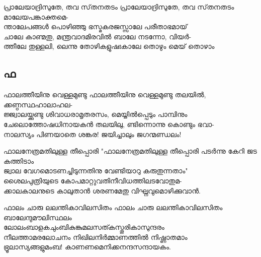 \begin{enumerate}


\begin{slokam}{\VSv}{\MPN}{പ്രാലേയാദ്രിസുതേ, തവ സ്‌തനതടം}
പ്രാലേയാദ്രിസുതേ, തവ സ്‌തനതടം മാലേയപങ്കാക്തമെ-\\
ന്താലേപങ്ങൾ പൊഴിഞ്ഞു ഭസ്മകരജസ്സാലേ പരീതാഭമായ്\\
ചാലേ കാണ്മതു, മന്ത്രവാദമിരവിൽ ബാലേ നടന്നോ, വിയർ-\\
ത്തീലേ തുള്ളലി, ലെന്നു തോഴികളുഷഃകാലേ തൊഴും മെയ് തൊഴാം
\end{slokam}



\end{enumerate}
\subsection{ഫ}
\begin{enumerate}

\begin{slokam}{\VSv}{\Unk}{ഫാലത്തീയിനു വെള്ളമുണ്ടു}
ഫാലത്തീയിനു വെള്ളമുണ്ടു തലയിൽ, ക്കണ്ഠസ്ഥഹാലാഹല-\\
ജ്ജ്വാലയ്ക്കുണ്ടു ശിവാധരാമൃതരസം, മെയ്യിൽപ്പെടും പാമ്പിനും\\
ചേലൊത്തോഷധിനായകൻ തലയിലു, ണ്ടിന്നൊന്നു കൊണ്ടും ഭവാ-\\
നാലസ്യം പിണയാതെ ശങ്കര! ജയിച്ചാലും ജഗന്മണ്ഡലം!
\end{slokam}



\begin{slokam}{\VKm}{\Balendu}{ഫാലനേത്രമതിലുള്ള തീപ്പൊരി}
"ഫാലനേത്രമതിലുള്ള തീപ്പൊരി പടര്‍ന്നു കേറി ജട കത്തിടാം\\
ജ്വാല വേഗമൊടണച്ചിടുന്നതിനു വേണ്ടിയാറു കരുതുന്നതാം"\\
ശൈലപുത്രിയുടെ കോപമാറ്റുവതിനീവിധത്തിലടവോതുമ-\\
ക്കാലകാലനുടെ കാലുതാന്‍ ശരണമേതു വിഘ്നവുമൊഴിക്കുവാന്‍.
\end{slokam}



\begin{slokam}{\VSv}{\KKK}{ഫാലം ചാരു ലലന്തികാവിലസിതം}
 ഫാലം ചാരു ലലന്തികാവിലസിതം ബാലേന്ദുമൗലിസ്ഥലം\\
ലോലംബാളകചുംബികുങ്കുമലസത്കസ്തൂരികാസുന്ദരം\\
നീലത്താമരലോചനം നിഖിലനിർമ്മാണത്തിൽ നിഷ്ണാതമാം\\
ഭ്രൂലാസ്യങ്ങളുമംബ! കാണണമെനിക്കനന്ദസന്ദായകം.
\end{slokam}



\end{enumerate}
